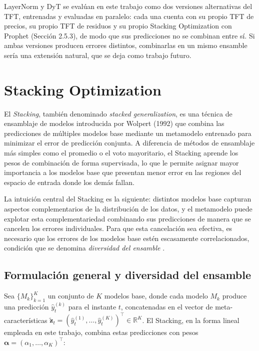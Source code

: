 LayerNorm y DyT se evalúan en este trabajo como dos versiones alternativas del TFT, entrenadas y evaluadas en paralelo: cada una cuenta con su propio TFT de precios, su propio TFT de residuos y su propio Stacking Optimization con Prophet (Sección 2.5.3), de modo que sus predicciones no se combinan entre sí. Si ambas versiones producen errores distintos, combinarlas en un mismo ensamble sería una extensión natural, que se deja como trabajo futuro.

\section{Stacking Optimization}

El \textit{Stacking}, también denominado \textit{stacked generalization}, es una técnica de ensamblaje de modelos introducida por Wolpert (1992) \cite{StackingWolpert} que combina las predicciones de múltiples modelos base mediante un metamodelo entrenado para minimizar el error de predicción conjunta. A diferencia de métodos de ensamblaje más simples como el promedio o el voto mayoritario, el Stacking aprende los pesos de combinación de forma supervisada, lo que le permite asignar mayor importancia a los modelos base que presentan menor error en las regiones del espacio de entrada donde los demás fallan.

La intuición central del Stacking es la siguiente: distintos modelos base capturan aspectos complementarios de la distribución de los datos, y el metamodelo puede explotar esta complementariedad combinando sus predicciones de manera que se cancelen los errores individuales. Para que esta cancelación sea efectiva, es necesario que los errores de los modelos base estén escasamente correlacionados, condición que se denomina \textit{diversidad del ensamble} \cite{Dietterich}.

\subsection{Formulación general y diversidad del ensamble}

Sea $\{M_k\}_{k=1}^K$ un conjunto de $K$ modelos base, donde cada modelo $M_k$ produce una predicción $\hat{y}_t^{(k)}$ para el instante $t$, concatenadas en el vector de meta-características $\tilde{\mathbf{z}}_t = (\hat{y}_t^{(1)}, \ldots, \hat{y}_t^{(K)})^\top \in \mathbb{R}^K$. El Stacking, en la forma lineal empleada en este trabajo, combina estas predicciones con pesos $\boldsymbol{\alpha} = (\alpha_1, \ldots, \alpha_K)^\top$:

